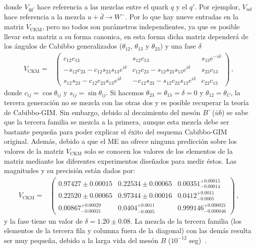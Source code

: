 %
donde $V_{q q'}$ hace referencia a las mezclas entre el quark $q$ y el $q'$. Por ejemplor, $V_{ud}$ hace referencia a la mezcla $u + \bar{d} \to W^{-}$. Por lo que hay nueve entradas en la matriz $V_{\text{CKM}}$, pero no todos son parámetros independientes, ya que es posible llevar esta matriz a su forma canonica, en esta forma dicha matriz dependerá de los ángulos de Cabibbo generalizados ($\theta_{12}$, $\theta_{13}$ y $\theta_{23}$) y una fase $\delta$
%
\begin{align*}
V_\text{CKM} =& 
\begin{pmatrix}
c_{12} c_{13} & s_{12} c_{13} & s_{13} e^{-i\delta} \\ 
-s_{12} c_{23} - c_{12} s_{23} s_{13} e^{i\delta} & c_{12} c_{23} - s_{12} s_{23} s_{13} e^{i\delta} & s_{23} c_{13} \\ 
s_{12} s_{23} - c_{12} c_{23} s_{13} e^{i\delta} & -c_{12} s_{23} - s_{12} c_{23} s_{13} e^{i\delta} & c_{23} c_{13} 
\end{pmatrix}\,,
\end{align*}
%
donde $c_{ij} = \cos \theta_{ij}$ y $s_{ij} = \sin \theta_{ij}$. Si hacemos $\theta_{23} = \theta_{13} = \delta = 0$ y $\theta_{12} = \theta_C$, la tercera generación no se mezcla con las otras dos y es posible recuperar la teoría de  Cabibbo-GIM. Sin embargo, debido al decaimiento del mesón $B^{-}$($\bar{u}b$) se sabe que la tercera familia se mezcla a la primera, aunque esta mezcla debe ser bastante pequeña para poder explicar el éxito del esquema Cabibbo-GIM original. Además, debido a que el ME no ofrece ninguna predicción sobre los valores de la matriz  $V_{\text{CKM}}$ solo se conocen los valores de los elementos de la matriz mediante los diferentes  experimentos diseñados para medir éstos. Las magnitudes y su precisión están dados por:
%
\begin{align*}
V_{\text{CKM}} =& 
\begin{pmatrix}
0.97427\pm 0.00015 & 0.22534\pm 0.00065 & 0.00351^{+0.00015}_{-0.00014} \\ 
0.22520\pm 0.00065 & 0.97344\pm 0.00016 & 0.0412^{+0.0011}_{-0.0005} \\ 
0.00867^{+0.00029}_{-0.00031} & 0.0404^{+0.0011}_{-0.0005} & 0.999146^{+0.000021}_{-0.000046}
\end{pmatrix}\,,
\end{align*}
%
y la fase tiene un valor de $\delta = 1.20 \pm 0.08$. La mezcla de la tercera familia (los elementos  de la tercera fila y columna fuera de la diagonal) con las demás resulta ser muy pequeña, debido a la larga vida del mesón $B$ ($10^{-12}$ seg)~\cite{Beringer:1900zz}.


